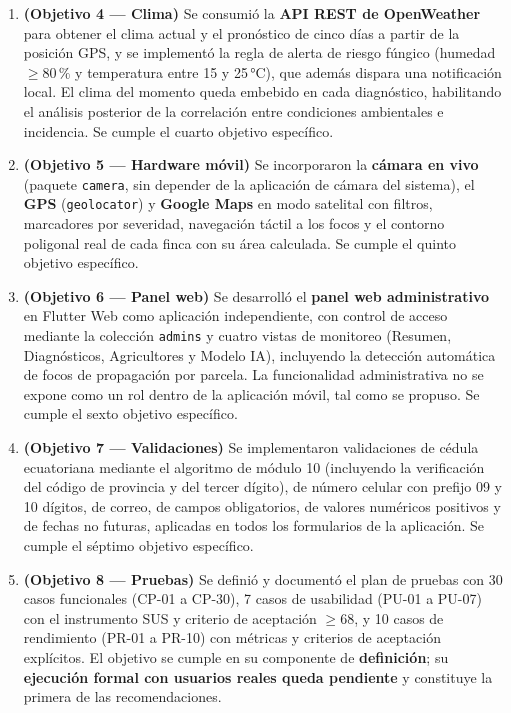 \documentclass[12pt,a4paper]{article}
\begin{document}
\begin{enumerate}
  \item \textbf{(Objetivo 4 --- Clima)} Se consumió la \textbf{API REST de
        OpenWeather} para obtener el clima actual y el pronóstico de cinco días a
        partir de la posición GPS, y se implementó la regla de alerta de riesgo
        fúngico (humedad $\geq 80\,\%$ y temperatura entre 15 y 25\,°C), que
        además dispara una notificación local. El clima del momento queda
        embebido en cada diagnóstico, habilitando el análisis posterior de la
        correlación entre condiciones ambientales e incidencia. Se cumple el
        cuarto objetivo específico.

  \item \textbf{(Objetivo 5 --- Hardware móvil)} Se incorporaron la
        \textbf{cámara en vivo} (paquete \texttt{camera}, sin depender de la
        aplicación de cámara del sistema), el \textbf{GPS} (\texttt{geolocator})
        y \textbf{Google Maps} en modo satelital con filtros, marcadores por
        severidad, navegación táctil a los focos y el contorno poligonal real de
        cada finca con su área calculada. Se cumple el quinto objetivo
        específico.

  \item \textbf{(Objetivo 6 --- Panel web)} Se desarrolló el \textbf{panel web
        administrativo} en Flutter Web como aplicación independiente, con control
        de acceso mediante la colección \texttt{admins} y cuatro vistas de
        monitoreo (Resumen, Diagnósticos, Agricultores y Modelo IA), incluyendo
        la detección automática de focos de propagación por parcela. La
        funcionalidad administrativa no se expone como un rol dentro de la
        aplicación móvil, tal como se propuso. Se cumple el sexto objetivo
        específico.

  \item \textbf{(Objetivo 7 --- Validaciones)} Se implementaron validaciones de
        cédula ecuatoriana mediante el algoritmo de módulo 10 (incluyendo la
        verificación del código de provincia y del tercer dígito), de número
        celular con prefijo 09 y 10 dígitos, de correo, de campos obligatorios,
        de valores numéricos positivos y de fechas no futuras, aplicadas en todos
        los formularios de la aplicación. Se cumple el séptimo objetivo
        específico.

  \item \textbf{(Objetivo 8 --- Pruebas)} Se definió y documentó el plan de
        pruebas con 30 casos funcionales (CP-01 a CP-30), 7 casos de usabilidad
        (PU-01 a PU-07) con el instrumento SUS y criterio de aceptación
        $\geq 68$, y 10 casos de rendimiento (PR-01 a PR-10) con métricas y
        criterios de aceptación explícitos. El objetivo se cumple en su
        componente de \textbf{definición}; su \textbf{ejecución formal con
        usuarios reales queda pendiente} y constituye la primera de las
        recomendaciones.
\end{enumerate}
\end{document}
